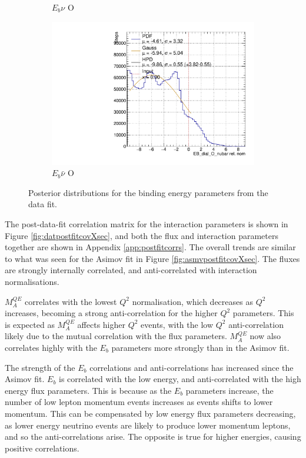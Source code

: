 \begin{figure}[!htbp]
\begin{subfigure}{.48\textwidth}
  \caption{$E_{b}\nu$ O}
\end{subfigure}
\begin{subfigure}{.48\textwidth}
  \centering
  \includegraphics[width=0.73\linewidth]{figs/EB_dial_O_nubarDataPoly}
  \caption{$E_{b}\bar{\nu}$ O}
\end{subfigure}
\caption{Posterior distributions for the binding energy parameters from the data fit.}
\label{fig:Ebdatares}
\end{figure}

The post-data-fit correlation matrix for the interaction parameters is shown in Figure \ref{fig:datpostfitcovXsec}, and both the flux and interaction parameters together are shown in Appendix \ref{app:postfitcorrs}. The overall trends are similar to what was seen for the Asimov fit in Figure \ref{fig:asmvpostfitcovXsec}. The fluxes are strongly internally correlated, and anti-correlated with interaction normalisations. 

$M^{QE}_A$ correlates with the lowest $Q^2$ normalisation, which decreases as $Q^2$ increases, becoming a strong anti-correlation for the higher $Q^2$ parameters. This is expected as $M^{QE}_A$ affects higher $Q^2$ events, with the low $Q^2$ anti-correlation likely due to the mutual correlation with the flux parameters. $M^{QE}_A$ now also correlates highly with the $E_b$ parameters more strongly than in the Asimov fit.

The strength of the $E_b$ correlations and anti-correlations has increased since the Asimov fit. $E_b$ is correlated with the low energy, and anti-correlated with the high energy flux parameters. This is because as the $E_b$ parameters increase, the number of low lepton momentum events increases as events shifts to lower momentum. This can be compensated by low energy flux parameters decreasing, as lower energy neutrino events are likely to produce lower momentum leptons, and so the anti-correlations arise. The opposite is true for higher energies, causing positive correlations.

